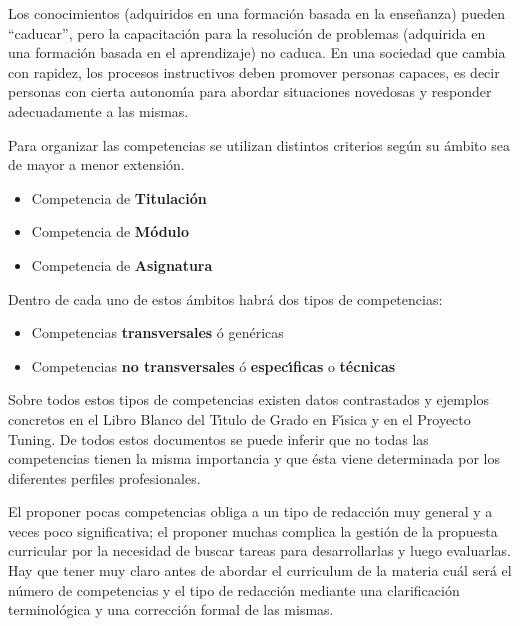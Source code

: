 Los {  conocimientos} (adquiridos en una formaci\'{o}n basada en la 
ense\~{n}anza)  {  pueden ``caducar''},  pero
la capacitaci\'{o}n para la resoluci\'{o}n de problemas
 (adquirida en una formaci\'{o}n basada en el
aprendizaje)  no caduca.
En una sociedad que cambia con rapidez, los procesos instructivos deben
{  promover personas capaces}, es decir personas con  cierta
autonom\'{\i}a para abordar situaciones novedosas y responder adecuadamente
a las mismas.


Para organizar las competencias se utilizan distintos criterios seg\'{u}n
su { \'{a}mbito} sea de mayor a menor extensi\'{o}n.
\begin{itemize}
\item Competencia de {\bf  Titulaci\'{o}n}
\item Competencia de {\bf  M\'{o}dulo}
\item Competencia de {\bf  Asignatura}
\end{itemize}
Dentro de cada uno de estos \'{a}mbitos habr\'{a} dos tipos de competencias:
\begin{itemize}
\item Competencias {\bf  transversales} \'{o} gen\'{e}ricas
\item Competencias {\bf  no transversales} \'{o} {\bf  espec\'{\i}ficas} o
{\bf  t\'{e}cnicas}
\end{itemize}

Sobre todos estos tipos de competencias existen datos contrastados y ejemplos 
concretos en el Libro Blanco del T\'{\i}tulo de Grado en F\'{\i}sica y
en el Proyecto Tuning.
De todos estos documentos se puede inferir que no todas las competencias
tienen la misma {  importancia} y que \'{e}sta viene determinada
por los diferentes perfiles profesionales.


El proponer pocas competencias obliga a un tipo
 de redacci\'{o}n
muy general y a veces poco significativa; el proponer muchas complica
la gesti\'{o}n de la propuesta curricular por la necesidad de buscar
tareas para desarrollarlas y luego evaluarlas. 
Hay que tener muy claro antes de abordar el curriculum de la 
materia cu\'{a}l ser\'{a} el n\'{u}mero de competencias y el tipo de 
redacci\'{o}n mediante una {  clarificaci\'{o}n terminol\'{o}gica}
y una {  correcci\'{o}n formal} de las mismas.

